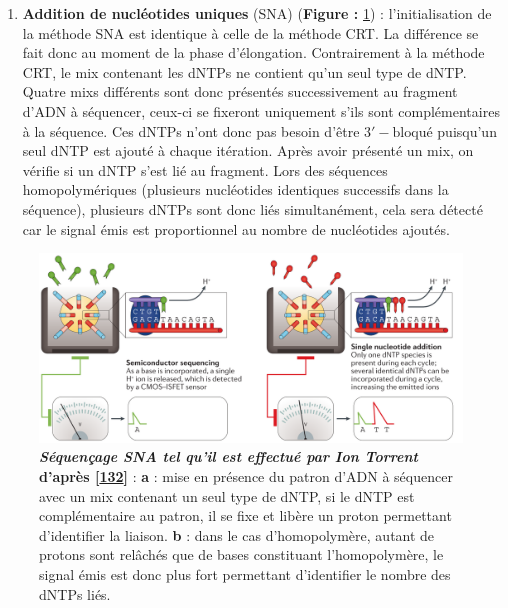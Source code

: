 \documentclass[12pt,a4paper,twoside]{ugathesis}
\providecommand{\tightlist}{%
  \setlength{\itemsep}{0pt}\setlength{\parskip}{0pt}}
\theoremstyle{definition}
\theoremstyle{definition}
\theoremstyle{definition}
\theoremstyle{remark}
\begin{document}
\newpage

\begin{enumerate}
\def\labelenumi{\alph{enumi}.}
\setcounter{enumi}{1}
\tightlist
\item
  \textbf{Addition de nucléotides uniques} (SNA) (\textbf{Figure :
  }\ref{fig:pictsnaSeq}) : l'initialisation de la méthode SNA est
  identique à celle de la méthode CRT. La différence se fait donc au
  moment de la phase d'élongation. Contrairement à la méthode CRT, le
  mix contenant les dNTPs ne contient qu'un seul type de dNTP. Quatre
  mixs différents sont donc présentés successivement au fragment d'ADN à
  séquencer, ceux-ci se fixeront uniquement s'ils sont complémentaires à
  la séquence. Ces dNTPs n'ont donc pas besoin d'être
  \(\mathrm{3'-bloqué}\) puisqu'un seul dNTP est ajouté à chaque
  itération. Après avoir présenté un mix, on vérifie si un dNTP s'est
  lié au fragment. Lors des séquences homopolymériques (plusieurs
  nucléotides identiques successifs dans la séquence), plusieurs dNTPs
  sont donc liés simultanément, cela sera détecté car le signal émis est
  proportionnel au nombre de nucléotides ajoutés.
\end{enumerate}

\begin{figure}

{\centering \includegraphics[scale=.26]{figure/SNA_seq_ionTorrent} 

}

\caption[Séquençage SNA tel qu'il est effectué par Ion Torrent]{\textbf{\emph{Séquençage SNA tel qu'il est effectué par
Ion Torrent} d'après {[}\protect\hyperlink{ref-Goodwin2016}{132}{]}} :
\textbf{a} : mise en présence du patron d'ADN à séquencer avec un mix
contenant un seul type de dNTP, si le dNTP est complémentaire au patron,
il se fixe et libère un proton permettant d'identifier la liaison.
\textbf{b} : dans le cas d'homopolymère, autant de protons sont relâchés
que de bases constituant l'homopolymère, le signal émis est donc plus
fort permettant d'identifier le nombre des dNTPs liés.}\label{fig:pictsnaSeq}
\end{figure}
\end{document}
